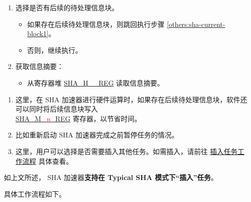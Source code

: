 \documentclass[main\_\_CN.tex]{subfiles}
\begin{document}
\begin{enumerate}
    \item 选择是否有后续的待处理信息块。
    \begin{itemize}
        \item 如果存在后续待处理信息块，则跳回执行步骤 \ref{others:sha-current-block1}。
        \item 否则，继续执行。
    \end{itemize}

    \item 获取信息摘要：
    \begin{itemize}
        \item 从寄存器堆 \hyperref[regdesc:SHAHNREG]{SHA\_H\_\_REG} 读取信息摘要。
    \end{itemize}
\end{enumerate}

\begin{tiplisting}\label{others:sha-note-typical-sha}
\vspace{-2.5em}
\begin{enumerate}
\item 这里，在 SHA 加速器进行硬件运算时，如果存在后续待处理信息块，软件还可以同时将后续信息块写入 \\ \hyperref[regdesc:SHAMNREG]{SHA\_M\_\textcolor{red}{\it{n}}\_REG} 寄存器，以节省时间。
\item 比如重新启动 SHA 加速器完成之前暂停任务的情况。
\item 这里，用户可以选择是否需要插入其他任务。如需插入，请前往 \hyperref[others:sha-interleaved]{插入任务工作流程} 具体查看。
\end{enumerate}
\end{tiplisting}

\label{others:sha-interleaved} 如上文所述，\chipname{} SHA 加速器\textbf{支持在 Typical SHA 模式下“插入”任务}。

具体工作流程如下。
\end{document}
